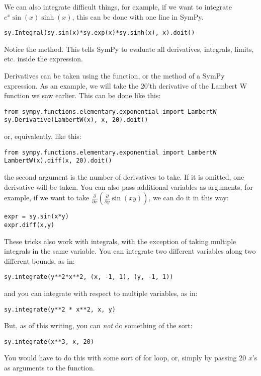 We can also integrate difficult things, for example, if we want to integrate $e^x\sin(x)\sinh(x)$, this can be done with one line in SymPy.
\begin{lstlisting}
sy.Integral(sy.sin(x)*sy.exp(x)*sy.sinh(x), x).doit()
\end{lstlisting}
Notice the  method.
This tells SymPy to evaluate all derivatives, integrals, limits, etc. inside the expression.

Derivatives can be taken using the  function, or the  method of a SymPy expression.
As an example, we will take the 20'th derivative of the Lambert W function we saw earlier.
This can be done like this:
\begin{lstlisting}
from sympy.functions.elementary.exponential import LambertW
sy.Derivative(LambertW(x), x, 20).doit()
\end{lstlisting}
or, equivalently, like this:
\begin{lstlisting}
from sympy.functions.elementary.exponential import LambertW
LambertW(x).diff(x, 20).doit()
\end{lstlisting}
the second argument is the number of derivatives to take.
If it is omitted, one derivative will be taken.
You can also pass additional variables as arguments, for example, if we want to take $\frac{\partial}{\partial x} \left( \frac{\partial}{\partial y}\sin\left(x y\right)\right)$, we can do it in this way:
\begin{lstlisting}
expr = sy.sin(x*y)
expr.diff(x,y)
\end{lstlisting}
These tricks also work with integrals, with the exception of taking multiple integrals in the same variable.
You can integrate two different variables along two different bounds, as in:
\begin{lstlisting}
sy.integrate(y**2*x**2, (x, -1, 1), (y, -1, 1))
\end{lstlisting}
and you can integrate with respect to multiple variables, as in:
\begin{lstlisting}
sy.integrate(y**2 * x**2, x, y)
\end{lstlisting}
But, as of this writing, you can \emph{not} do something of the sort:
\begin{lstlisting}
sy.integrate(x**3, x, 20)
\end{lstlisting}
You would have to do this with some sort of for loop, or, simply by passing 20 $x$'s as arguments to the function.

